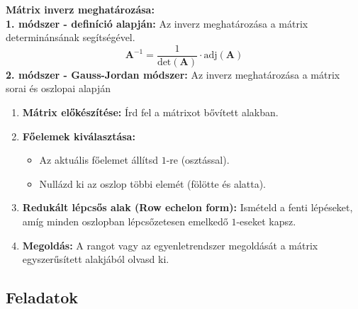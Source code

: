 \documentclass[a4paper, 12pt]{scrartcl}
\begin{document}
\begin{blueBox}
  \textbf{\large Mátrix inverz meghatározása:}\\

  \textbf{1. módszer - definíció alapján:} Az inverz meghatározása a mátrix determinánsának segítségével.
  \[
    \textbf{A}^{-1} = \frac{1}{\text{det}(\textbf{A})} \cdot \text{adj}(\textbf{A})
  \]
  \textbf{2. módszer - Gauss-Jordan módszer:} Az inverz meghatározása a mátrix sorai és oszlopai alapján
  \begin{enumerate}
    \item \textbf{Mátrix előkészítése:} Írd fel a mátrixot bővített alakban.
    \item \textbf{Főelemek kiválasztása:}
          \begin{itemize}
            \item Az aktuális főelemet állítsd \(1\)-re (osztással).
            \item Nullázd ki az oszlop többi elemét (fölötte és alatta).
          \end{itemize}
    \item \textbf{Redukált lépcsős alak (Row echelon form):} Ismételd a fenti lépéseket, amíg minden oszlopban lépcsőzetesen emelkedő \(1\)-eseket kapsz.
    \item \textbf{Megoldás:} A rangot vagy az egyenletrendszer megoldását a mátrix egyszerűsített alakjából olvasd ki.
  \end{enumerate}

\end{blueBox}

\clearpage
\subsection{Feladatok}
\end{document}
